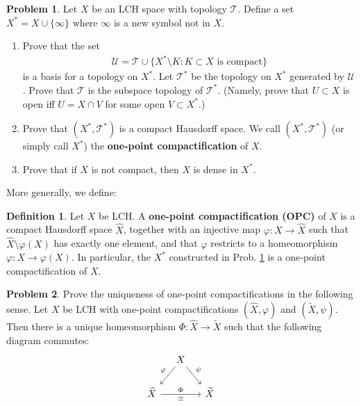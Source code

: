 \documentclass[12pt,b5paper,notitlepage]{article}
\theoremstyle{definition}
\newtheorem{df}{Definition}[section]
\newtheorem{prob}{\color{red}Problem}[section]
\theoremstyle{plain}
\newcommand{\mc}{\mathcal}
\newcommand{\wtd}{\widetilde}
\newcommand{\wht}{\widehat}
\numberwithin{equation}{section}
\begin{document}
\begin{prob}\label{lb431}
Let $X$ be an LCH space with topology $\mc T$. Define a set $X^*=X\cup\{\infty\}$ where $\infty$ is a new symbol not in $X$. 
\begin{enumerate}
\item Prove that the set
\begin{align*}
\mc U=\mc T\cup\{X^*\setminus K:K\subset X\text{ is compact}\}
\end{align*}
is a basis for a topology on $X^*$. Let $\mc T^*$ be the topology on $X^*$ generated by $\mc U$. Prove that $\mc T$ is the subspace topology of $\mc T^*$. (Namely, prove that $U\subset X$ is open iff $U=X\cap V$ for some open $V\subset X^*$.)
\item Prove that $(X^*,\mc T^*)$ is a compact Hausdorff space. We call $(X^*,\mc T^*)$ (or simply call $X^*$) the \textbf{one-point compactification}  of $X$.
\item Prove that if $X$ is not compact, then $X$ is dense in $X^*$.
\end{enumerate}
\end{prob}


More generally, we define:
\begin{df}
Let $X$ be LCH. A \textbf{one-point compactification (OPC)} of  $X$ is a compact Hausdorff space $\wht X$, together with an injective map $\varphi:X\rightarrow \wht X$ such that $\wht X\setminus \varphi(X)$ has exactly one element,  and that $\varphi$ restricts to a homeomorphism $\varphi:X\rightarrow\varphi(X)$. In particular, the $X^*$ constructed in Prob. \ref{lb431} is a one-point compactification of $X$.
\end{df}



\begin{prob}
Prove the uniqueness of one-point compactifications in the following sense. Let $X$ be LCH with one-point compactifications $(\wht X,\varphi)$ and $(\wtd X,\psi)$. Then there is a unique homeomorphism $\Phi:\wht X\rightarrow\wtd X$ such that the following diagram commutes:
\begin{equation}
\begin{tikzcd}[column sep=small]
                     & X \arrow[ld,"\varphi"'] \arrow[rd,"\psi"] &   \\
\wht X \arrow[rr, "\Phi","\simeq"'] &                         & \wtd X
\end{tikzcd}
\end{equation}
\end{prob}
\end{document}
